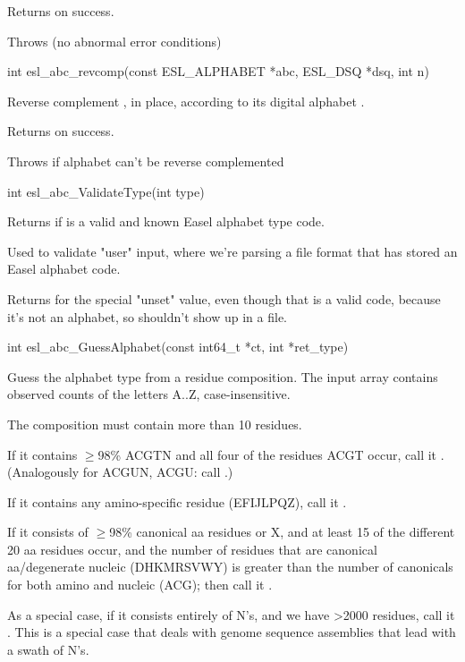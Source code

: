 \begin{sreapi}
Returns  on success.

Throws (no abnormal error conditions)


\hypertarget{func:esl_abc_revcomp()}
{\item[int esl\_abc\_revcomp(const ESL\_ALPHABET *abc, ESL\_DSQ *dsq, int n)]}

Reverse complement , in place, according to
its digital alphabet .

Returns  on success.

Throws  if alphabet  can't be reverse complemented


\hypertarget{func:esl_abc_ValidateType()}
{\item[int esl\_abc\_ValidateType(int type)]}

Returns  if  is a valid and known Easel
alphabet type code.

Used to validate "user" input, where we're parsing a
file format that has stored an Easel alphabet code.

Returns  for the special  "unset"
value, even though that is a valid code, because it's
not an alphabet, so shouldn't show up in a file.


\hypertarget{func:esl_abc_GuessAlphabet()}
{\item[int esl\_abc\_GuessAlphabet(const int64\_t *ct, int *ret\_type)]}

Guess the alphabet type from a residue composition.
The input  array contains observed counts of 
the letters A..Z, case-insensitive. 

The composition  must contain more than 10 residues.

If it contains $\geq$98\% ACGTN and all four of the
residues ACGT occur, call it . (Analogously for
ACGUN, ACGU: call .)

If it contains any amino-specific residue (EFIJLPQZ),
call it .  

If it consists of $\geq$98\% canonical aa residues or X,
and at least 15 of the different 20 aa residues occur,
and the number of residues that are canonical aa/degenerate
nucleic (DHKMRSVWY) is greater than the number of canonicals
for both amino and nucleic (ACG); then call it .

As a special case, if it consists entirely of N's, and
we have >2000 residues, call it . This is a
special case that deals with genome sequence assemblies
that lead with a swath of N's.


\end{sreapi}
